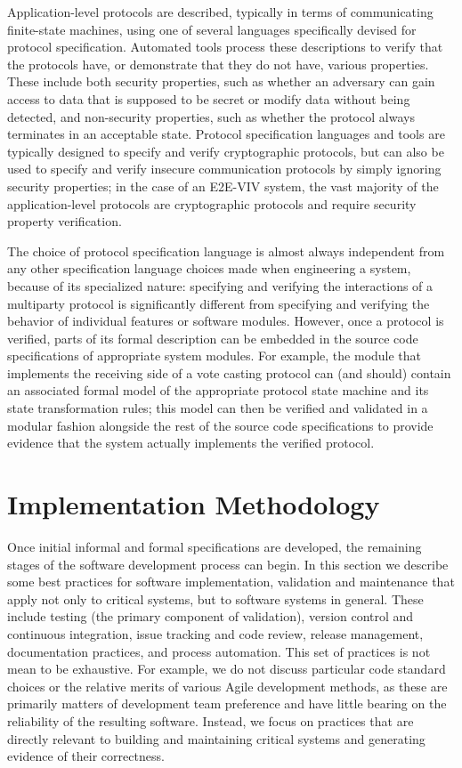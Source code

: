 Application-level protocols are described, typically in terms of
communicating finite-state machines, using one of several languages
specifically devised for protocol specification. Automated tools
process these descriptions to verify that the protocols have, or
demonstrate that they do not have, various properties. These include
both security properties, such as whether an adversary can gain access
to data that is supposed to be secret or modify data without being
detected, and non-security properties, such as whether the protocol
always terminates in an acceptable state. Protocol specification
languages and tools are typically designed to specify and verify
cryptographic protocols, but can also be used to specify and verify
insecure communication protocols by simply ignoring security
properties; in the case of an E2E-VIV system, the vast majority of the
application-level protocols are cryptographic protocols and require
security property verification.

The choice of protocol specification language is almost always
independent from any other specification language choices made when
engineering a system, because of its specialized nature: specifying
and verifying the interactions of a multiparty protocol is
significantly different from specifying and verifying the behavior of
individual features or software modules. However, once a protocol is
verified, parts of its formal description can be embedded in the
source code specifications of appropriate system modules. For example,
the module that implements the receiving side of a vote casting
protocol can (and should) contain an associated formal model of the
appropriate protocol state machine and its state transformation rules;
this model can then be verified and validated in a modular fashion
alongside the rest of the source code specifications to provide
evidence that the system actually implements the verified protocol.

\section{Implementation Methodology}

Once initial informal and formal specifications are developed, the
remaining stages of the software development process can begin. In
this section we describe some best practices for software
implementation, validation and maintenance that apply not only to
critical systems, but to software systems in general. These include
testing (the primary component of validation), version control and
continuous integration, issue tracking and code review, release
management, documentation practices, and process automation. This set
of practices is not mean to be exhaustive. For example, we do not
discuss particular code standard choices or the relative merits of
various Agile development methods, as these are primarily matters of
development team preference and have little bearing on the reliability
of the resulting software. Instead, we focus on practices that are
directly relevant to building and maintaining critical systems and
generating evidence of their correctness.


